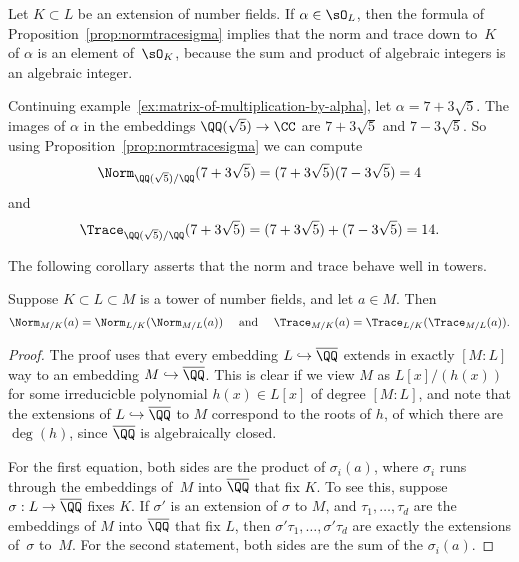 \begin{remark}
  Let $K\subset L$ be an extension of number fields.  If
  $\alpha\in \sO_L$, then the formula of
  Proposition~\ref{prop:normtracesigma} implies that the norm and trace
  down to~$K$ of $\alpha$ is an element of~$\sO_K$, because the sum and
  product of algebraic integers is an algebraic integer.
\end{remark}

\begin{example}
	Continuing example~\ref{ex:matrix-of-multiplication-by-alpha},
	let $\alpha = 7 + 3\sqrt{5}$. The images of $\alpha$ in the embeddings
	$\QQ(\sqrt{5}) \to \CC$ are $7 + 3\sqrt{5}$ and $7 - 3\sqrt{5}$. So
	using Proposition~\ref{prop:normtracesigma} we can compute
	\[
		\Norm_{\QQ(\sqrt{5})/\QQ}(7 + 3\sqrt{5})
		=
		(7 + 3\sqrt{5})(7 - 3\sqrt{5})
		=
		4
	\]
	and
	\[
		\Trace_{\QQ(\sqrt{5})/\QQ}(7 + 3\sqrt{5})
		=
		(7 + 3\sqrt{5}) + (7 - 3\sqrt{5})
		=
		14.
	\]
\end{example}

The following corollary asserts that the norm and trace behave well in
towers.
\begin{corollary}
  \label{cor:compatower}
  Suppose $K\subset L \subset M$ is a tower of number fields, and
  let $a\in M$.  Then
  \[
    \Norm_{M/K}(a) = \Norm_{L/K}(\Norm_{M/L}(a))
    \quad\text{ and }\quad
    \Trace_{M/K}(a) = \Trace_{L/K}(\Trace_{M/L}(a)).
  \]
\end{corollary}
\begin{proof}
  The proof uses that every embedding $L \hookrightarrow \overline{\QQ}$ extends in exactly
  $[M:L]$ way to an embedding $M \hookrightarrow \overline{\QQ}$.  This is clear
  if we view $M$ as $L[x]/(h(x))$ for some irreducicble
  polynomial $h(x) \in L[x]$ of degree $[M:L]$, and note that
  the extensions of $L \hookrightarrow \overline{\QQ}$ to $M$ correspond to
  the roots of $h$, of which there are $\deg(h)$, since $\overline{\QQ}$
  is algebraically closed.

  For the first equation, both sides are the product of $\sigma_i(a)$,
  where $\sigma_i$ runs through the embeddings of~$M$ into $\overline{\QQ}$
  that fix $K$.  To see this, suppose $\sigma:L\to \overline{\QQ}$ fixes $K$.
  If $\sigma'$ is an extension of $\sigma$ to $M$, and $\tau_1,\dots,
  \tau_d$ are the embeddings of $M$ into $\overline{\QQ}$ that fix $L$, then
  $\sigma'\tau_1,\dots,\sigma'\tau_d$ are exactly the extensions
  of~$\sigma$ to~$M$.  For the second statement, both sides are the
  sum of the $\sigma_i(a)$.
\end{proof}

